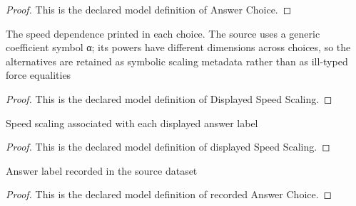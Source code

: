 \begin{proof}
  This is the declared model definition of Answer Choice.
\end{proof}
\begin{definition}
  \label{def:physics:phyx-mini-0244:phyxminiproblems-problemphyxmini0244-displayedspeedscaling}
  The speed dependence printed in each choice. The source uses a generic coefficient symbol α; its powers have different dimensions across choices, so the alternatives are retained as symbolic scaling metadata rather than as ill-typed force equalities
\end{definition}
\begin{proof}
  This is the declared model definition of Displayed Speed Scaling.
\end{proof}
\begin{definition}
  \label{def:physics:phyx-mini-0244:phyxminiproblems-problemphyxmini0244-displayedspeedscaling-value}
  Speed scaling associated with each displayed answer label
\end{definition}
\begin{proof}
  This is the declared model definition of displayed Speed Scaling.
\end{proof}
\begin{definition}
  \label{def:physics:phyx-mini-0244:phyxminiproblems-problemphyxmini0244-recordedanswerchoice}
  Answer label recorded in the source dataset
\end{definition}
\begin{proof}
  This is the declared model definition of recorded Answer Choice.
\end{proof}

